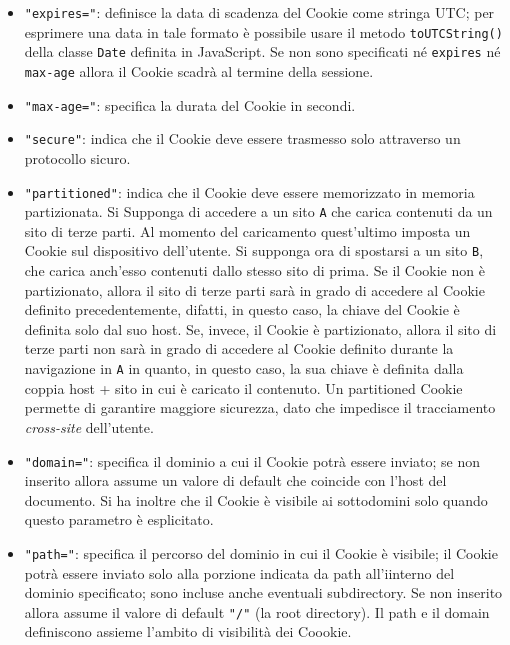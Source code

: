\documentclass[a4paper, 12pt, twoside, openright]{book}
\begin{document}
\begin{itemize}
\item\texttt{"expires="}: definisce la data di scadenza del Cookie come stringa UTC; per esprimere una data in tale formato è possibile usare il metodo \texttt{toUTCString()} della classe \texttt{Date} definita in JavaScript\cite{MDN_Web_docs:cookies}. Se non sono specificati né \texttt{expires} né \texttt{max-age} allora il Cookie scadrà al termine della sessione\cite{MDN_Web_docs:cookies}.
\item\texttt{"max-age="}: specifica la durata del Cookie in secondi\cite{MDN_Web_docs:cookies}.
\item\texttt{"secure"}: indica che il Cookie deve essere trasmesso solo attraverso un protocollo sicuro\cite{MDN_Web_docs:cookies}.
\item\texttt{"partitioned"}: indica che il Cookie deve essere memorizzato in memoria partizionata\cite{MDN_Web_docs:cookies}. Si Supponga di accedere a un sito \texttt{A} che carica contenuti da un sito di terze parti. Al momento del caricamento quest'ultimo imposta un Cookie sul dispositivo dell'utente. Si supponga ora di spostarsi a un sito \texttt{B}, che carica anch'esso contenuti dallo stesso sito di prima. Se il Cookie non è partizionato, allora il sito di terze parti sarà in grado di accedere al Cookie definito precedentemente, difatti, in questo caso, la chiave del Cookie è definita solo dal suo host. Se, invece, il Cookie è partizionato, allora il sito di terze parti non sarà in grado di accedere al Cookie definito durante la navigazione in \texttt{A} in quanto, in questo caso, la sua chiave è definita dalla coppia host + sito in cui è caricato il contenuto\cite{MDN_Web_docs:CHIPS}. Un partitioned Cookie permette di garantire maggiore sicurezza, dato che impedisce il tracciamento \textit{cross-site} dell'utente\cite{MDN_Web_docs:CHIPS}.
\item\texttt{"domain="}: specifica il dominio a cui il Cookie potrà essere inviato; se non inserito allora assume un valore di default che coincide con l'host del documento. Si ha inoltre che il Cookie è visibile ai sottodomini solo quando questo parametro è esplicitato\cite{MDN_Web_docs:cookies}.
\item\texttt{"path="}: specifica il percorso del dominio in cui il Cookie è visibile; il Cookie potrà essere inviato solo alla porzione indicata da path all'iinterno del dominio specificato; sono incluse anche eventuali subdirectory\cite{MDN_Web_docs:HTTP_cookies}. Se non inserito allora assume il valore di default \texttt{"/"} (la root directory). Il path e il domain definiscono assieme l'ambito di visibilità dei Coookie\cite{Wiki:cookies}.

\end{itemize}
\end{document}
